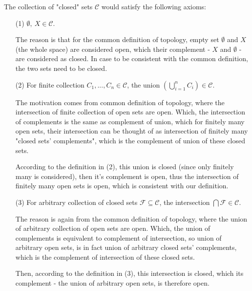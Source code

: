 \documentclass{article}
\begin{document}
The collection of "closed" sets $\mathcal{C}$ would satisfy the following axioms:
\begin{itemize}
    \item[(1)] $\emptyset,\ X\in \mathcal{C}$. 
    
    The reason is that for the common definition of topology, 
    empty set $\emptyset$ and $X$ (the whole space) are considered open, which their complement - $X$ and $\emptyset$ -
    are considered as closed. In case to be consistent with the common definition, the two sets need to be closed.

    \hfill

    \item[(2)] For finite collection $C_1,...,C_n \in \mathcal{C}$, the union $\left(\bigcup_{i=1}^{n}C_i\right)\in \mathcal{C}$.
    
    The motivation comes from common definition of topology, where the intersection of finite collection of open sets are open.
    Which, the intersection of complements is the same as complement of union, which for finitely many open sets,
    their intersection can be thought of as intersection of finitely many "closed sets' complements", which is the complement of union of these closed sets.
    
    According to the definition in (2), this union is closed (since only finitely many is considered), then it's complement is open,
    thus the intersection of finitely many open sets is open, which is consistent with our definition.

    \hfill

    \item[(3)] For arbitrary collection of closed sets $\mathcal{F}\subseteq \mathcal{C}$, the intersection $\bigcap \mathcal{F}\in \mathcal{C}$.
    
    The reason is again from the common definition of topology, where the union of arbitrary collection of open sets are open.
    Which, the union of complements is equivalent to complement of intersection, so union of arbitrary open sets,
    is in fact union of arbitrary closed sets' complements, which is the complement of intersection of these closed sets.

    Then, according to the definition in (3), this intersection is closed, which its complement - the union of arbitrary open sets, is therefore open.
    
\end{itemize}

\break
\end{document}
